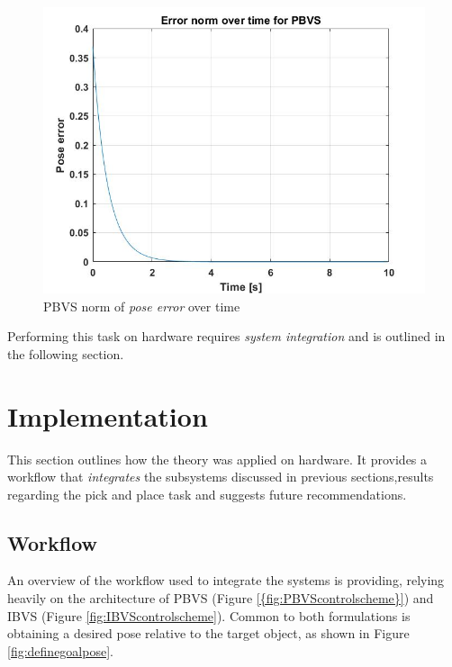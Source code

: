 \documentclass{UoNMCHA}
\numberwithin{equation}{section}
\begin{document}
\begin{figure}[H]
	\begin{center}
		\includegraphics[width=.7\linewidth]{Figures/PBVSerror}
		\caption{PBVS norm of \textit{pose error} over time}
	\end{center}
\end{figure}

Performing this task on hardware requires \textit{system integration} and is outlined in the following section.
 
\newpage
\section{Implementation}\label{Implementation}

This section outlines how the theory was applied on hardware. It provides a workflow that \textit{integrates} the subsystems discussed in previous sections,results regarding the pick and place task and suggests future recommendations.

\subsection{Workflow}

An overview of the workflow used to integrate the systems is providing, relying heavily on the architecture of PBVS (Figure \ref{{fig:PBVScontrolscheme}}) and IBVS (Figure \ref{fig:IBVScontrolscheme}). Common to both formulations is obtaining a desired pose relative to the target object, as shown in Figure \ref{fig:definegoalpose}.
\end{document}
